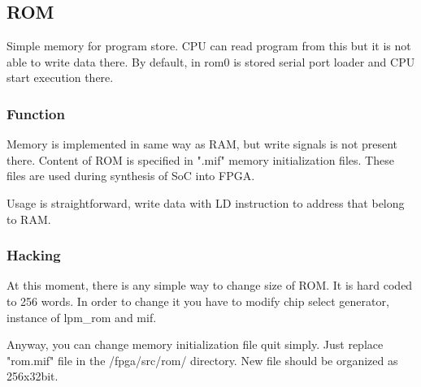 \subsection{ROM}

Simple memory for program store. CPU can read program from this but it is not
able to write data there. By default, in rom0 is stored serial port loader and
CPU start execution there.

\subsubsection{Function}

Memory is implemented in same way as RAM, but write signals is not present
there. Content of ROM is specified in ".mif" memory initialization files. These
files are used during synthesis of SoC into FPGA.

Usage is straightforward, write data with LD instruction to address that belong
to RAM.


\subsubsection{Hacking}

At this moment, there is any simple way to change size of ROM. It is hard coded
to 256 words. In order to change it you have to modify chip select generator,
instance of lpm\_rom and mif.

Anyway, you can change memory initialization file quit simply. Just replace
"rom.mif" file in the /fpga/src/rom/ directory. New file should be organized
as 256x32bit.
